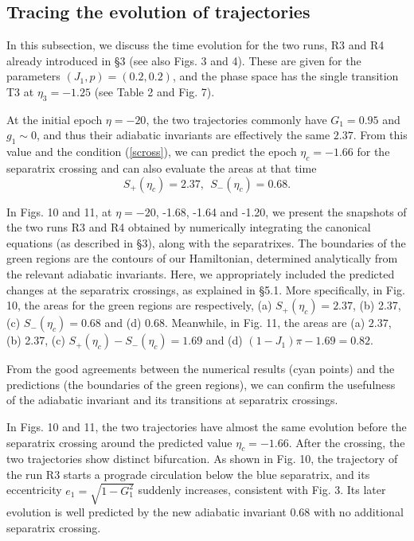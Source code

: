 \documentclass[useAMS,usenatbib,twocolumn]{mn2e}
\newcommand{\beq}{\begin{equation}}
\newcommand{\eeq}{\end{equation}}
\begin{document}
\subsection{Tracing the evolution of trajectories}

In this subsection, we discuss the time evolution for the two runs, R3 and R4 already introduced in \S 3 (see also Figs. 3 and 4). These are given for the parameters $(J_1,p)=(0.2,0.2)$, and the phase space has the single transition T3 at $\eta_3=-1.25$ (see Table 2 and Fig. 7).


At the initial epoch $\eta=-20$, the two trajectories commonly have $G_1=0.95$ and $g_1\sim 0$, and thus their adiabatic invariants are effectively the same $2.37$.  From this value and  the condition (\ref{scross}),   we can predict the epoch $\eta_c=-1.66$ for the separatrix crossing and  can also evaluate the  areas at that time
\beq
S_+(\eta_c)=2.37,~~S_-(\eta_c)=0.68.
\eeq

In Figs. 10 and 11, at $\eta=-20$, -1.68, -1.64 and -1.20, we present  the snapshots of the two runs R3 and R4 obtained by numerically integrating the canonical equations (as described in \S 3), along with the separatrixes. The boundaries of the green regions are the contours of our Hamiltonian,  determined analytically from the relevant adiabatic invariants.  Here, we appropriately included the predicted changes at the separatrix crossings, as explained in \S 5.1. 
More specifically, in Fig. 10, the  areas for the green regions are respectively, (a) $S_+(\eta_c)=2.37$, (b) 2.37, (c) $S_-(\eta_c)=0.68$ and (d) 0.68.  Meanwhile, in Fig. 11, the areas are (a) $2.37$, (b) 2.37, (c) $S_+(\eta_c)-S_-(\eta_c)=1.69$ and (d) $(1-J_1)\pi-1.69=0.82$.


 From the good agreements between the numerical results (cyan points) and the predictions (the boundaries of the green regions), we can  confirm the usefulness of the adiabatic invariant and its transitions at separatrix crossings. 



In Figs. 10 and 11, the two trajectories have almost the same evolution before the separatrix crossing around the predicted value $\eta_c=-1.66$. After the crossing, the two trajectories show distinct bifurcation.  As shown in Fig. 10, the trajectory of the run R3 starts a prograde circulation below the blue separatrix,  and its eccentricity $e_1=\sqrt{1-G_1^2}$  suddenly increases, consistent with Fig. 3.
 Its later evolution is well predicted by the new adiabatic invariant $0.68$  with no additional separatrix crossing. 
\end{document}
